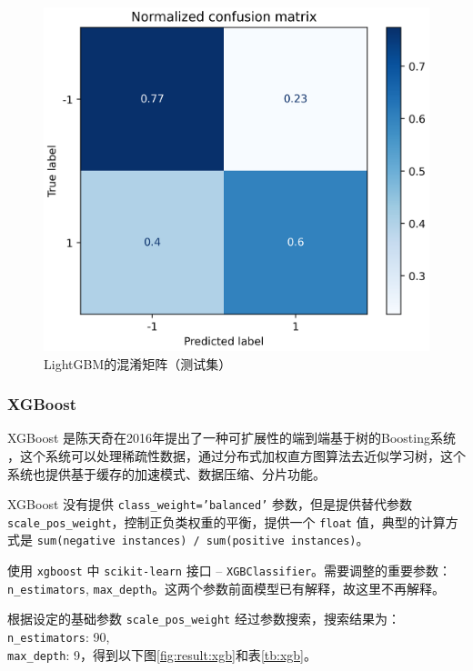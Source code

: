 \documentclass[a4paper]{article}
\begin{document}
\begin{figure}[!h]
    \centering
    \includegraphics[width=0.48\linewidth]{LightGBM_confus_mat-norm.png}
    \caption{LightGBM的混淆矩阵（测试集）}
    \label{fig:result:lgbm}
\end{figure}


\subsubsection{XGBoost}

XGBoost 是陈天奇在2016年提出了一种可扩展性的端到端基于树的Boosting系统 \cite{chen2016xgboost}，这个系统可以处理稀疏性数据，通过分布式加权直方图算法去近似学习树，这个系统也提供基于缓存的加速模式、数据压缩、分片功能。



XGBoost 没有提供 \texttt{class\_weight='balanced'} 参数，但是提供替代参数 \texttt{scale\_pos\_weight}，控制正负类权重的平衡，提供一个 \texttt{float} 值，典型的计算方式是 \texttt{sum(negative instances) / sum(positive instances)}。

使用 \texttt{xgboost} 中 \texttt{scikit-learn} 接口  -- \texttt{XGBClassifier}。需要调整的重要参数：\texttt{n\_estimators}, \texttt{max\_depth}。这两个参数前面模型已有解释，故这里不再解释。


根据设定的基础参数 \texttt{scale\_pos\_weight} 经过参数搜索，搜索结果为：\texttt{n\_estimators}: 90, \\\texttt{max\_depth}: 9，得到以下图\ref{fig:result:xgb}和表\ref{tb:xgb}。
\end{document}
